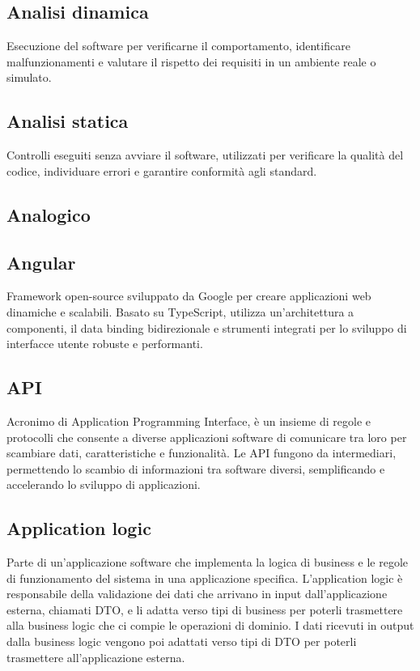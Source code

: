 \hypertarget{sec:analisi_dinamica}{}
\subsection*{Analisi dinamica}
Esecuzione del software per verificarne il comportamento, identificare malfunzionamenti e valutare il rispetto dei requisiti in un ambiente reale o simulato.

\hypertarget{sec:analisi_statica}{}
\subsection*{Analisi statica}
Controlli eseguiti senza avviare il software, utilizzati per verificare la qualità del codice, individuare errori e garantire conformità agli standard.

\hypertarget{sec:analogico}{}
\subsection*{Analogico}


\hypertarget{sec:angular}{}
\subsection*{Angular}
Framework open-source sviluppato da Google per creare applicazioni web dinamiche e scalabili. Basato su TypeScript, utilizza un'architettura a componenti, 
il data binding bidirezionale e strumenti integrati per lo sviluppo di interfacce utente robuste e performanti.

\hypertarget{sec:api}{}
\subsection*{API}
Acronimo di Application Programming Interface, è un insieme di regole e protocolli che consente a diverse applicazioni software di comunicare tra loro 
per scambiare dati, caratteristiche e funzionalità. Le API fungono da intermediari, permettendo lo scambio di informazioni tra software diversi, semplificando 
e accelerando lo sviluppo di applicazioni.

\hypertarget{sec:application_logic}{}
\subsection*{Application logic}
Parte di un'applicazione software che implementa la logica di business e le regole di funzionamento del sistema in una applicazione specifica.
L'application logic è responsabile della validazione dei dati che arrivano in input dall'applicazione esterna, chiamati DTO, e li adatta
verso tipi di business per poterli trasmettere alla business logic che ci compie le operazioni di dominio. I dati ricevuti in output dalla business logic
vengono poi adattati verso tipi di DTO per poterli trasmettere all'applicazione esterna.

